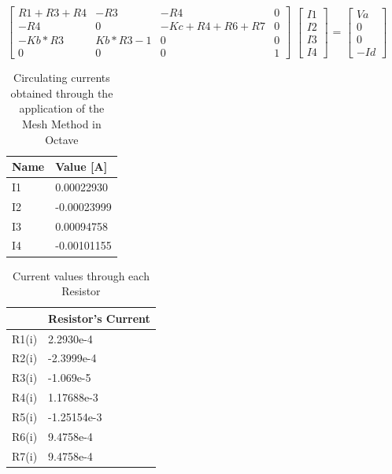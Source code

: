 \documentclass[11en, a4paper, oneside]{article}
\begin{document}
$\begin{bmatrix}
R1+R3+R4 & -R3 & -R4 & 0\\
   
-R4 & 0 & -Kc+R4+R6+R7 & 0\\

-Kb*R3 & Kb*R3-1 & 0 & 0\\

0 & 0 & 0 & 1
\end{bmatrix}$
$\begin{bmatrix}
I1\\
I2\\
I3\\
I4
\end{bmatrix}$
= 
$\begin{bmatrix}
Va\\
0\\
0\\
-Id
\end{bmatrix}$

\begin{table}[ht]
\begin{center}
    \begin{tabular}{|l|l|}
\hline
\textbf{Name} & \textbf{Value {[}A{]}} \\ \hline
I1            & 0.00022930             \\ \hline
I2            & -0.00023999            \\ \hline
I3            & 0.00094758             \\ \hline
I4            & -0.00101155            \\ \hline
\end{tabular}
\caption{Circulating currents obtained through the application of the Mesh Method in Octave}
\end{center}
\end{table}

\begin{table}[h]
\begin{center}
\begin{tabular}{|l|l|}
\hline
\textbf{} & \textbf{Resistor's Current} \\ \hline
R1(i)     & 2.2930e-4                   \\ \hline
R2(i)     & -2.3999e-4                  \\ \hline
R3(i)     & -1.069e-5                   \\ \hline
R4(i)     & 1.17688e-3                  \\ \hline
R5(i)     & -1.25154e-3                 \\ \hline
R6(i)     & 9.4758e-4                   \\ \hline
R7(i)     & 9.4758e-4                   \\ \hline
\end{tabular}
\caption{Current values through each Resistor}
\end{center}
\end{table}
\end{document}
